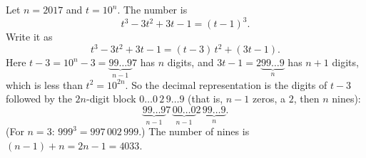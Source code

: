 Let $n=2017$ and $t=10^n$. The number is
\[
t^3-3t^2+3t-1=(t-1)^3 .
\]
Write it as
\[
t^3-3t^2+3t-1=(t-3)\,t^2+(3t-1).
\]
Here $t-3=10^n-3=\underbrace{99\ldots9}_{n-1}7$ has $n$ digits, and $3t-1=2\underbrace{99\ldots9}_{n}$ has $n+1$ digits, which is less than $t^2=10^{2n}$. So the decimal representation is the digits of $t-3$ followed by the $2n$-digit block $0\ldots0\,2\,9\ldots9$ (that is, $n-1$ zeros, a $2$, then $n$ nines):
\[
\underbrace{99\ldots9}_{n-1}7\,\underbrace{00\ldots0}_{n-1}2\,\underbrace{99\ldots9}_{n}.
\]
(For $n=3$: $999^3=997\,002\,999$.) The number of nines is $(n-1)+n=2n-1=\boxed{4033}$.
